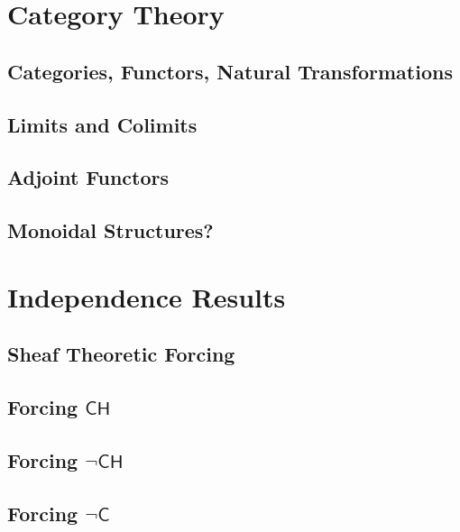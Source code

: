 \documentclass{article}
\begin{document}
	\newpage
	\section{Category Theory}
	\subsection{Categories, Functors, Natural Transformations}
	\subsection{Limits and Colimits}
	\subsection{Adjoint Functors}
	\subsection{Monoidal Structures?}

	\newpage
	\section{Independence Results}
	\subsection{Sheaf Theoretic Forcing}
	\subsection{Forcing $\mathsf{CH}$}
	\subsection{Forcing $\lnot\mathsf{CH}$}
	\subsection{Forcing $\lnot \mathsf{C}$}
\end{document}
